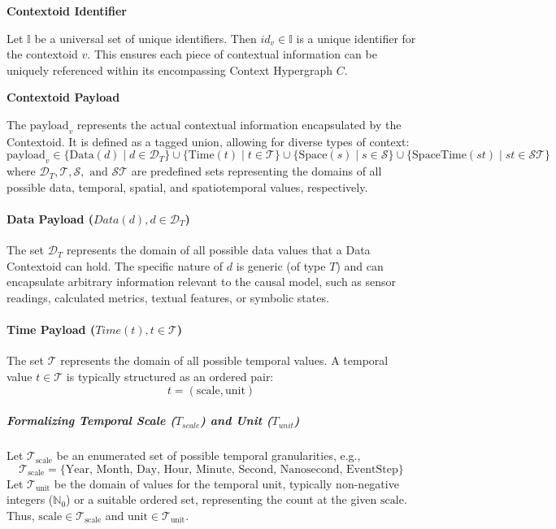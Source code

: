 \textbf{Contextoid Identifier}

Let \(\mathbb{I}\) be a universal set of unique identifiers.
Then \( id_v \in \mathbb{I} \) is a unique identifier for the contextoid \(v\). This ensures each piece of contextual information can be uniquely referenced within its encompassing Context Hypergraph \(C\).


\textbf{Contextoid Payload}

The \( \text{payload}_v \) represents the actual contextual information encapsulated by the Contextoid. It is defined as a tagged union, allowing for diverse types of context:
\[ \text{payload}_v \in \{ \text{Data}(d) \mid d \in \mathcal{D}_T \} \cup \{ \text{Time}(t) \mid t \in \mathcal{T} \} \cup \{ \text{Space}(s) \mid s \in \mathcal{S} \} \cup \{ \text{SpaceTime}(st) \mid st \in \mathcal{ST} \} \]
where $\mathcal{D}_T, \mathcal{T}, \mathcal{S}, \text{ and } \mathcal{ST}$ are predefined sets representing the domains of all possible data, temporal, spatial, and spatiotemporal values, respectively.

\paragraph[Data Payload]{Data Payload (\(Data(d), d \in \mathcal{D}_T\))}\label{par:data_payload}

The set \(\mathcal{D}_T\) represents the domain of all possible data values that a Data Contextoid can hold. The specific nature of \(d\) is generic (of type \(T\)) and can encapsulate arbitrary information relevant to the causal model, such as sensor readings, calculated metrics, textual features, or symbolic states.

\paragraph[Time Payload]{Time Payload (\(Time(t), t \in \mathcal{T}\))}\label{par:time_payload}

The set \(\mathcal{T}\) represents the domain of all possible temporal values. A temporal value \(t \in \mathcal{T}\) is typically structured as an ordered pair:
\[ t = (\text{scale}, \text{unit}) \]

\subparagraph[Temporal Scale and Unit]{Formalizing Temporal Scale (\(T_{scale}\)) and Unit (\(T_{unit}\))}
\label{subpar:temporal_scale_unit}

Let \(\mathcal{T}_{\text{scale}}\) be an enumerated set of possible temporal granularities, e.g.,
\[ \mathcal{T}_{\text{scale}} = \{\text{Year, Month, Day, Hour, Minute, Second, Nanosecond, EventStep}\} \]
Let \(\mathcal{T}_{\text{unit}}\) be the domain of values for the temporal unit, typically non-negative integers (\(\mathbb{N}_0\)) or a suitable ordered set, representing the count at the given \(\text{scale}\).
Thus, \(\text{scale} \in \mathcal{T}_{\text{scale}}\) and \(\text{unit} \in \mathcal{T}_{\text{unit}}\).

